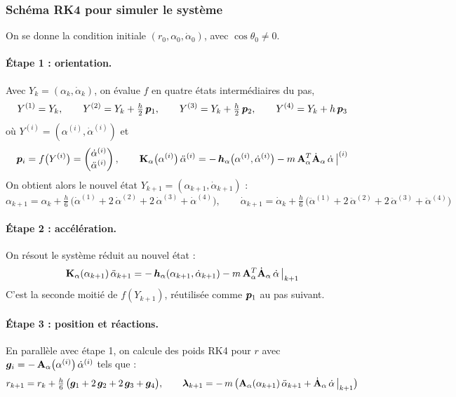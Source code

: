 \subsubsection{Schéma RK4 pour simuler le système}

On se donne la condition initiale $(r_0,\alpha_0,\dot\alpha_0)$, avec
$\cos\theta_0 \neq 0$.

\paragraph{Étape 1 : orientation.} Avec $Y_k = (\alpha_k,\dot\alpha_k)$,
on évalue $f$ en quatre états intermédiaires du pas,
\[
    Y^{(1)} = Y_k,
    \qquad
    Y^{(2)} = Y_k + \tfrac{h}{2}\,\bm{p}_1,
    \qquad
    Y^{(3)} = Y_k + \tfrac{h}{2}\,\bm{p}_2,
    \qquad
    Y^{(4)} = Y_k + h\,\bm{p}_3
\]
où $Y^{(i)} = (\alpha^{(i)},\dot\alpha^{(i)})$ et
\[
    \bm{p}_i = f\bigl(Y^{(i)}\bigr)
    = \begin{pmatrix} \dot\alpha^{(i)}\\ \ddot\alpha^{(i)} \end{pmatrix},
    \qquad
    \mathbf{K}_\alpha\bigl(\alpha^{(i)}\bigr)\,\ddot\alpha^{(i)}
    = -\,\bm{h}_\alpha\bigl(\alpha^{(i)},\dot\alpha^{(i)}\bigr)
    - m\,\mathbf{A}_\alpha^T\dot{\mathbf{A}}_\alpha\,\dot\alpha\,\big|^{(i)}
\]
On obtient alors le nouvel état $Y_{k+1} = (\alpha_{k+1},\dot\alpha_{k+1})$ :
\[
    \alpha_{k+1} = \alpha_k + \tfrac{h}{6}\,\bigl(\dot\alpha^{(1)}
    + 2\,\dot\alpha^{(2)} + 2\,\dot\alpha^{(3)} + \dot\alpha^{(4)}\bigr),
    \qquad
    \dot\alpha_{k+1} = \dot\alpha_k + \tfrac{h}{6}\,\bigl(\ddot\alpha^{(1)}
    + 2\,\ddot\alpha^{(2)} + 2\,\ddot\alpha^{(3)} + \ddot\alpha^{(4)}\bigr)
\]

\paragraph{Étape 2 : accélération.} On résout le système réduit au
nouvel état :
\[
    \mathbf{K}_\alpha(\alpha_{k+1})\,\ddot\alpha_{k+1}
    = -\,\bm{h}_\alpha(\alpha_{k+1},\dot\alpha_{k+1})
    - m\,\mathbf{A}_\alpha^T\dot{\mathbf{A}}_\alpha\,\dot\alpha\,\big|_{k+1}
\]
C'est la seconde moitié de $f(Y_{k+1})$, réutilisée comme $\bm{p}_1$
au pas suivant.

\paragraph{Étape 3 : position et réactions.} En parallèle avec étape 1, on calcule des poids RK4 pour $r$ avec 
$\bm{g}_i = -\,\mathbf{A}_\alpha\bigl(\alpha^{(i)}\bigr)\,
\dot\alpha^{(i)}$ tels que : 
\[
    r_{k+1} = r_k + \tfrac{h}{6}\,\bigl(\bm{g}_1 + 2\,\bm{g}_2
    + 2\,\bm{g}_3 + \bm{g}_4\bigr),
    \qquad
    \bm{\lambda}_{k+1} = -\,m\,\bigl(\mathbf{A}_\alpha(\alpha_{k+1})\,
    \ddot\alpha_{k+1}
    + \dot{\mathbf{A}}_\alpha\,\dot\alpha\,\big|_{k+1}\bigr)
\]



